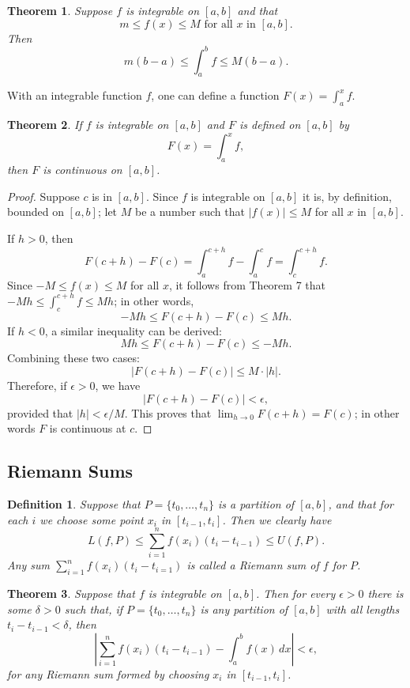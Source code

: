 \documentclass{article}
\numberwithin{corollary}{subsection}
\newtheorem{definition}{Definition}
\numberwithin{definition}{subsection}
\numberwithin{lemma}{subsection}
\newtheorem{theorem}{Theorem}
\numberwithin{theorem}{subsection}
\begin{document}
\begin{theorem}
  Suppose $f$ is integrable on $[a, b]$ and that \[
    m \leq f(x) \leq M \text{ for all } x \text{ in } [a, b].
  \] Then \[
    m(b - a) \leq \int_a^b f \leq M(b - a).
  \]
\end{theorem}

With an integrable function $f$, one can define a function $F(x) = \int_a^x f$.

\begin{theorem}
  If $f$ is integrable on $[a, b]$ and $F$ is defined on $[a, b]$ by
  \begin{equation*}
    F(x) = \int_a^x f,
  \end{equation*} then $F$ is continuous on $[a, b]$.
\end{theorem}

\begin{proof}
  Suppose $c$ is in $[a, b]$. Since $f$ is integrable on $[a, b]$ it is, by
  definition, bounded on $[a, b]$; let $M$ be a number such that $|f(x)| \leq
  M$ for all $x$ in $[a, b]$.

  If $h > 0$, then \[
    F(c + h) - F(c) = \int_a^{c + h} f - \int_a^c f = \int_c^{c + h} f.
  \] Since $-M \leq f(x) \leq M$ for all $x$, it follows from Theorem 7 that
  $-Mh \leq \int_c^{c + h} f \leq Mh$; in other words, \[
    -Mh \leq F(c + h) - F(c) \leq Mh.
  \] If $h < 0$, a similar inequality can be derived: \[
    Mh \leq F(c + h) - F(c) \leq -Mh.
  \] Combining these two cases: \[
    |F(c + h) - F(c)| \leq M \cdot |h|.
  \] Therefore, if $\epsilon > 0$, we have \[
    |F(c + h) - F(c)| < \epsilon,
  \] provided that $|h| < \epsilon/M$. This proves that $\lim_{h \to 0}
  F(c + h) = F(c)$; in other words $F$ is continuous at $c$.
\end{proof}

\subsection{Riemann Sums}

\begin{definition}
  Suppose that $P = \{t_0, \ldots, t_n\}$ is a partition of $[a, b]$, and that
  for each $i$ we choose some point $x_i$ in $[t_{i-1}, t_i]$. Then we clearly
  have \[
    L(f, P) \leq \sum_{i=1}^n f(x_i)(t_i - t_{i-1}) \leq U(f, P).
  \] Any sum $\sum_{i=1}^n f(x_i)(t_i - t_{i=1})$ is called a \emph{Riemann
  sum} of $f$ for $P$.
\end{definition}

\begin{theorem}
  Suppose that $f$ is integrable on $[a, b]$. Then for every $\epsilon > 0$
  there is some $\delta > 0$ such that, if $P = \{t_0, \ldots, t_n\}$ is any
  partition of $[a, b]$ with all lengths $t_i - t_{i-1} < \delta$, then \[
    \left|\sum_{i=1}^n f(x_i)(t_i - t_{i-1}) - \int_a^b f(x) \,dx\right| <
    \epsilon,
  \] for any Riemann sum formed by choosing $x_i$ in $[t_{i-1}, t_i]$.
\end{theorem}
\end{document}
